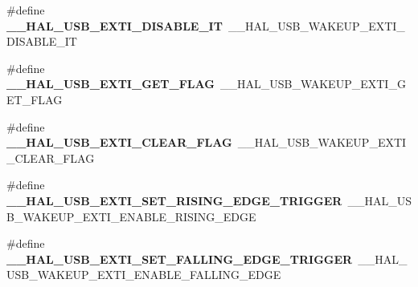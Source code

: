 \begin{DoxyCompactItemize}
\item 
\hypertarget{group___h_a_l___u_s_b___aliased___macros_ga9ae38cfb5026c3868e5d9e9325ab801c}{\#define {\bfseries \-\_\-\-\_\-\-H\-A\-L\-\_\-\-U\-S\-B\-\_\-\-E\-X\-T\-I\-\_\-\-D\-I\-S\-A\-B\-L\-E\-\_\-\-I\-T}~\-\_\-\-\_\-\-H\-A\-L\-\_\-\-U\-S\-B\-\_\-\-W\-A\-K\-E\-U\-P\-\_\-\-E\-X\-T\-I\-\_\-\-D\-I\-S\-A\-B\-L\-E\-\_\-\-I\-T}\label{group___h_a_l___u_s_b___aliased___macros_ga9ae38cfb5026c3868e5d9e9325ab801c}

\item 
\hypertarget{group___h_a_l___u_s_b___aliased___macros_ga6eac2b0cbade80df102638ce9eec5fff}{\#define {\bfseries \-\_\-\-\_\-\-H\-A\-L\-\_\-\-U\-S\-B\-\_\-\-E\-X\-T\-I\-\_\-\-G\-E\-T\-\_\-\-F\-L\-A\-G}~\-\_\-\-\_\-\-H\-A\-L\-\_\-\-U\-S\-B\-\_\-\-W\-A\-K\-E\-U\-P\-\_\-\-E\-X\-T\-I\-\_\-\-G\-E\-T\-\_\-\-F\-L\-A\-G}\label{group___h_a_l___u_s_b___aliased___macros_ga6eac2b0cbade80df102638ce9eec5fff}

\item 
\hypertarget{group___h_a_l___u_s_b___aliased___macros_gabaf7fe70f4008c0b9a81a0032b7b38fb}{\#define {\bfseries \-\_\-\-\_\-\-H\-A\-L\-\_\-\-U\-S\-B\-\_\-\-E\-X\-T\-I\-\_\-\-C\-L\-E\-A\-R\-\_\-\-F\-L\-A\-G}~\-\_\-\-\_\-\-H\-A\-L\-\_\-\-U\-S\-B\-\_\-\-W\-A\-K\-E\-U\-P\-\_\-\-E\-X\-T\-I\-\_\-\-C\-L\-E\-A\-R\-\_\-\-F\-L\-A\-G}\label{group___h_a_l___u_s_b___aliased___macros_gabaf7fe70f4008c0b9a81a0032b7b38fb}

\item 
\hypertarget{group___h_a_l___u_s_b___aliased___macros_gaef664a7c509860ae0f3a1abb427cf4f7}{\#define {\bfseries \-\_\-\-\_\-\-H\-A\-L\-\_\-\-U\-S\-B\-\_\-\-E\-X\-T\-I\-\_\-\-S\-E\-T\-\_\-\-R\-I\-S\-I\-N\-G\-\_\-\-E\-D\-G\-E\-\_\-\-T\-R\-I\-G\-G\-E\-R}~\-\_\-\-\_\-\-H\-A\-L\-\_\-\-U\-S\-B\-\_\-\-W\-A\-K\-E\-U\-P\-\_\-\-E\-X\-T\-I\-\_\-\-E\-N\-A\-B\-L\-E\-\_\-\-R\-I\-S\-I\-N\-G\-\_\-\-E\-D\-G\-E}\label{group___h_a_l___u_s_b___aliased___macros_gaef664a7c509860ae0f3a1abb427cf4f7}

\item 
\hypertarget{group___h_a_l___u_s_b___aliased___macros_ga852708fb3258bdc4b7d6b246d9ac32b9}{\#define {\bfseries \-\_\-\-\_\-\-H\-A\-L\-\_\-\-U\-S\-B\-\_\-\-E\-X\-T\-I\-\_\-\-S\-E\-T\-\_\-\-F\-A\-L\-L\-I\-N\-G\-\_\-\-E\-D\-G\-E\-\_\-\-T\-R\-I\-G\-G\-E\-R}~\-\_\-\-\_\-\-H\-A\-L\-\_\-\-U\-S\-B\-\_\-\-W\-A\-K\-E\-U\-P\-\_\-\-E\-X\-T\-I\-\_\-\-E\-N\-A\-B\-L\-E\-\_\-\-F\-A\-L\-L\-I\-N\-G\-\_\-\-E\-D\-G\-E}\label{group___h_a_l___u_s_b___aliased___macros_ga852708fb3258bdc4b7d6b246d9ac32b9}


\end{DoxyCompactItemize}

